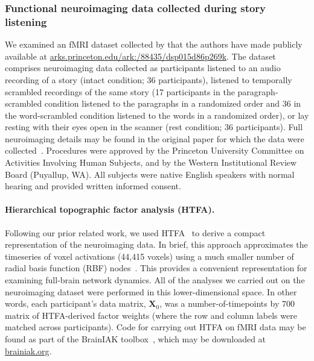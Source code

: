 \documentclass[english]{article}
\begin{document}
\subsubsection*{Functional neuroimaging data collected during story
  listening}
We examined an fMRI dataset collected by \cite{SimoEtal16} that the
authors have made publicly available at
\href{http://arks.princeton.edu/ark:/88435/dsp015d86p269k}{arks.princeton.edu/ark:/88435/dsp015d86p269k}.  The dataset
comprises neuroimaging data collected as participants listened
to an audio recording of a story (intact condition; 36 participants),
listened to temporally scrambled recordings of the same story (17
participants in the paragraph-scrambled condition listened to the
paragraphs in a randomized order and 36 in the word-scrambled
condition listened to the words in a randomized order), or lay resting
with their eyes open in the scanner (rest condition; 36
participants).  Full neuroimaging details may be found in the original
paper for which the data were collected~\citep{SimoEtal16}. Procedures
were approved by the Princeton University Committee on Activities
Involving Human Subjects, and by the Western Institutional Review Board (Puyallup, WA). All subjects were native English speakers with normal hearing and provided written informed consent.

\paragraph{Hierarchical topographic factor analysis (HTFA).}
Following our prior related work, we used HTFA~\citep{MannEtal18} to
derive a compact representation of the neuroimaging data.  In brief,
this approach approximates the timeseries of voxel activations (44,415
voxels) using a much smaller number of radial basis function (RBF)
nodes~\citep[in this case, 700 nodes, as determined by an optimization
procedure described by][]{MannEtal18}.  This provides a convenient
representation for examining full-brain network dynamics.  All of the
analyses we carried out on the neuroimaging dataset were performed in
this lower-dimensional space.  In other words, each participant's data
matrix, $\mathbf{X}_0$, was a number-of-timepoints by 700 matrix of
HTFA-derived factor weights (where the row and column labels were
matched across participants).  Code for carrying out HTFA on fMRI data
may be found as part of the BrainIAK toolbox~\citep{CapoEtal17}, which
may be downloaded at \href{https://brainiak.org/}{brainiak.org}.
\end{document}
